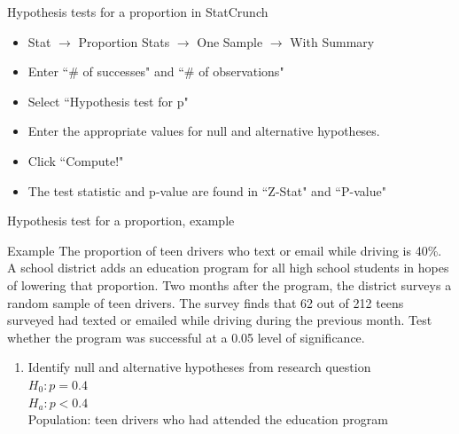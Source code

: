 \documentclass[xcolor=table, handout]{beamer}
\begin{document}
\begin{frame}{Hypothesis tests for a proportion in StatCrunch}

\begin{block}{}
\large
\begin{itemize}
\item Stat $\to$ Proportion Stats $\to$ One Sample $\to$ With Summary
\item Enter ``\# of successes" and ``\# of observations"
\item Select ``Hypothesis test for p"
\item Enter the appropriate values for null and alternative hypotheses.
\item Click ``Compute!"
\item The test statistic and p-value are found in ``Z-Stat" and ``P-value"
\end{itemize}
\end{block}

\end{frame}

\begin{frame}{Hypothesis test for a proportion, example}
\begin{exampleblock}{Example}
\large
The proportion of teen drivers who text or email while driving is 40\%. A school district adds an education program for all high school students in hopes of lowering that proportion. Two months after the program, the district surveys a random sample of teen drivers. The survey finds that 62 out of 212 teens surveyed had texted or emailed while driving during the previous month. Test whether the program was successful at a 0.05 level of significance.
\begin{enumerate}
\pause\item Identify null and alternative hypotheses from research question\\
\pause$H_0: p = 0.4$\\
$H_a: p < 0.4$\\
Population: teen drivers who had attended the education program
\end{enumerate}
\end{exampleblock}
\end{frame}
\end{document}
